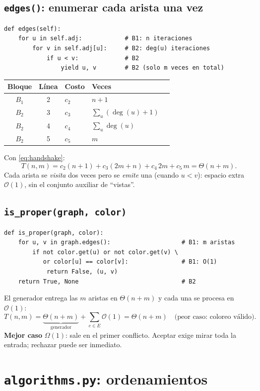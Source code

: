 \documentclass[11pt,a4paper]{article}
\theoremstyle{definition}
\theoremstyle{remark}
\newcommand{\dg}{\operatorname{deg}}
\newcommand{\bigO}{\mathcal{O}}
\begin{document}
\subsection{\texttt{edges()}: enumerar cada arista una vez}
\begin{lstlisting}
def edges(self):
    for u in self.adj:            # B1: n iteraciones
        for v in self.adj[u]:     # B2: deg(u) iteraciones
            if u < v:             # B2
                yield u, v        # B2 (solo m veces en total)
\end{lstlisting}
\begin{center}
\begin{tabular}{@{}cclll@{}}
\toprule
\textbf{Bloque} & \textbf{Línea} & \textbf{Costo} & \textbf{Veces}\\
\midrule
$B_1$ & 2 & $c_2$ & $n+1$\\
$B_2$ & 3 & $c_3$ & $\sum_u(\dg(u)+1)$\\
$B_2$ & 4 & $c_4$ & $\sum_u\dg(u)$\\
$B_2$ & 5 & $c_5$ & $m$\\
\bottomrule
\end{tabular}
\end{center}
Con \eqref{eq:handshake}:
\[
T(n,m)=c_2(n{+}1)+c_3(2m{+}n)+c_4\,2m+c_5\,m=\Theta(n+m).
\]
Cada arista se \emph{visita} dos veces pero se \emph{emite} una (cuando $u<v$):
espacio extra $\bigO(1)$, sin el conjunto auxiliar de ``vistas''.

\subsection{\texttt{is\_proper(graph, color)}}
\begin{lstlisting}
def is_proper(graph, color):
    for u, v in graph.edges():                    # B1: m aristas
        if not color.get(u) or not color.get(v) \
           or color[u] == color[v]:               # B1: O(1)
            return False, (u, v)
    return True, None                             # B2
\end{lstlisting}
El generador entrega las $m$ aristas en $\Theta(n+m)$ y cada una se procesa en
$\bigO(1)$:
\[
T(n,m)=\underbrace{\Theta(n+m)}_{\text{generador}}+\sum_{e\in E}\bigO(1)=\Theta(n+m)
\quad\text{(peor caso: coloreo válido).}
\]
\textbf{Mejor caso} $\Omega(1)$: sale en el primer conflicto. Aceptar exige mirar
toda la entrada; rechazar puede ser inmediato.

\section{\texttt{algorithms.py}: ordenamientos}\label{sec:orden}
\end{document}
